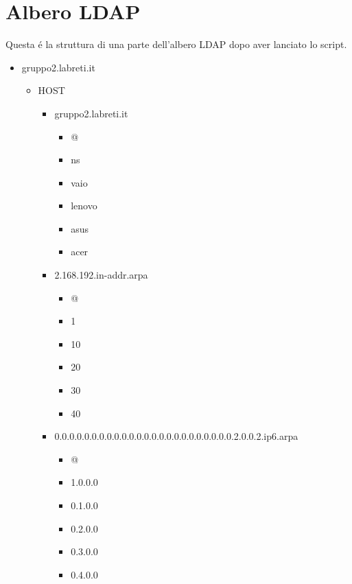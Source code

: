 \documentclass[9pt, a4paper, oneside]{article}
\begin{document}
		\section{Albero LDAP}
			\par
				Questa \'e la struttura di una parte 
				dell'albero LDAP dopo aver lanciato lo script.
				\begin{itemize}
					\item
						gruppo2.labreti.it
						\begin{itemize}
							\item
								HOST
								\begin{itemize}
									\item
										gruppo2.labreti.it
										\begin{itemize}
											\item
												@
											\item
												ns
											\item
												vaio
											\item
												lenovo
											\item
												asus
											\item
												acer
										\end{itemize}
									\item
										2.168.192.in-addr.arpa
										\begin{itemize}
											\item
												@
											\item
												1
											\item
												10
											\item
												20
											\item
												30
											\item
												40
										\end{itemize}			
									\item
										0.0.0.0.0.0.0.0.0.0.0.0.0.0.0.0.0.0.0.0.0.0.0.0.2.0.0.2.ip6.arpa
										\begin{itemize}
											\item
												@
											\item
												1.0.0.0
											\item
												0.1.0.0
											\item
												0.2.0.0
											\item
												0.3.0.0
											\item
												0.4.0.0
										\end{itemize}
								\end{itemize}
						\end{itemize}
				\end{itemize}
\end{document}
